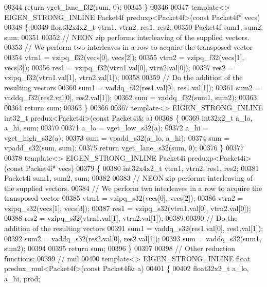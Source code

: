 \begin{DoxyCode}
{{00344   \textcolor{keywordflow}{return} vget\_lane\_f32(sum, 0);
00345 \}
00346 
00347 \textcolor{keyword}{template}<> EIGEN\_STRONG\_INLINE Packet4f preduxp<Packet4f>(\textcolor{keyword}{const} Packet4f* vecs)
00348 \{
00349   float32x4x2\_t vtrn1, vtrn2, res1, res2;
00350   Packet4f sum1, sum2, sum;
00351 
00352   \textcolor{comment}{// NEON zip performs interleaving of the supplied vectors.}
00353   \textcolor{comment}{// We perform two interleaves in a row to acquire the transposed vector}
00354   vtrn1 = vzipq\_f32(vecs[0], vecs[2]);
00355   vtrn2 = vzipq\_f32(vecs[1], vecs[3]);
00356   res1 = vzipq\_f32(vtrn1.val[0], vtrn2.val[0]);
00357   res2 = vzipq\_f32(vtrn1.val[1], vtrn2.val[1]);
00358 
00359   \textcolor{comment}{// Do the addition of the resulting vectors}
00360   sum1 = vaddq\_f32(res1.val[0], res1.val[1]);
00361   sum2 = vaddq\_f32(res2.val[0], res2.val[1]);
00362   sum = vaddq\_f32(sum1, sum2);
00363 
00364   \textcolor{keywordflow}{return} sum;
00365 \}
00366 
00367 \textcolor{keyword}{template}<> EIGEN\_STRONG\_INLINE int32\_t predux<Packet4i>(\textcolor{keyword}{const} Packet4i& a)
00368 \{
00369   int32x2\_t a\_lo, a\_hi, sum;
00370 
00371   a\_lo = vget\_low\_s32(a);
00372   a\_hi = vget\_high\_s32(a);
00373   sum = vpadd\_s32(a\_lo, a\_hi);
00374   sum = vpadd\_s32(sum, sum);
00375   \textcolor{keywordflow}{return} vget\_lane\_s32(sum, 0);
00376 \}
00377 
00378 \textcolor{keyword}{template}<> EIGEN\_STRONG\_INLINE Packet4i preduxp<Packet4i>(\textcolor{keyword}{const} Packet4i* vecs)
00379 \{
00380   int32x4x2\_t vtrn1, vtrn2, res1, res2;
00381   Packet4i sum1, sum2, sum;
00382 
00383   \textcolor{comment}{// NEON zip performs interleaving of the supplied vectors.}
00384   \textcolor{comment}{// We perform two interleaves in a row to acquire the transposed vector}
00385   vtrn1 = vzipq\_s32(vecs[0], vecs[2]);
00386   vtrn2 = vzipq\_s32(vecs[1], vecs[3]);
00387   res1 = vzipq\_s32(vtrn1.val[0], vtrn2.val[0]);
00388   res2 = vzipq\_s32(vtrn1.val[1], vtrn2.val[1]);
00389 
00390   \textcolor{comment}{// Do the addition of the resulting vectors}
00391   sum1 = vaddq\_s32(res1.val[0], res1.val[1]);
00392   sum2 = vaddq\_s32(res2.val[0], res2.val[1]);
00393   sum = vaddq\_s32(sum1, sum2);
00394 
00395   \textcolor{keywordflow}{return} sum;
00396 \}
00397 
00398 \textcolor{comment}{// Other reduction functions:}
00399 \textcolor{comment}{// mul}
00400 \textcolor{keyword}{template}<> EIGEN\_STRONG\_INLINE \textcolor{keywordtype}{float} predux\_mul<Packet4f>(\textcolor{keyword}{const} Packet4f& a)
00401 \{
00402   float32x2\_t a\_lo, a\_hi, prod;
}}
\end{DoxyCode}
